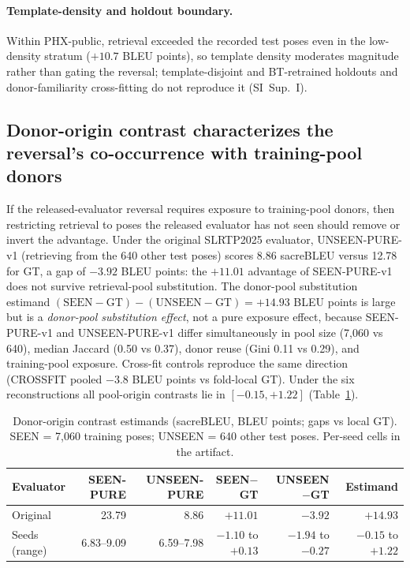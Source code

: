\documentclass[pdflatex,sn-chicago]{sn-jnl}
\begin{document}
\paragraph{Template-density and holdout boundary.}
Within PHX-public, retrieval exceeded the recorded test poses even in the low-density stratum ($+10.7$ BLEU points), so template density moderates magnitude rather than gating the reversal; template-disjoint and BT-retrained holdouts and donor-familiarity cross-fitting do not reproduce it (SI~Sup.~I).

\subsection{Donor-origin contrast characterizes the reversal's co-occurrence with training-pool donors}
\label{sec:exposure_results}

If the released-evaluator reversal requires exposure to training-pool donors, then restricting retrieval to poses the released evaluator has not seen should remove or invert the advantage. Under the original SLRTP2025 evaluator, UNSEEN-PURE-v1 (retrieving from the 640 other test poses) scores 8.86 sacreBLEU versus 12.78 for GT, a gap of $-3.92$ BLEU points: the $+11.01$ advantage of SEEN-PURE-v1 does not survive retrieval-pool substitution. The donor-pool substitution estimand $(\text{SEEN}-\text{GT})-(\text{UNSEEN}-\text{GT})=+14.93$ BLEU points is large but is a \emph{donor-pool substitution effect}, not a pure exposure effect, because SEEN-PURE-v1 and UNSEEN-PURE-v1 differ simultaneously in pool size (7{,}060 vs 640), median Jaccard (0.50 vs 0.37), donor reuse (Gini 0.11 vs 0.29), and training-pool exposure. Cross-fit controls reproduce the same direction (CROSSFIT pooled $-3.8$ BLEU points vs fold-local GT). Under the six reconstructions all pool-origin contrasts lie in $[-0.15,+1.22]$ (Table~\ref{tab:exposure_estimands}).

\begin{table}[t]
\centering
\scriptsize\setlength{\tabcolsep}{3pt}
\caption{Donor-origin contrast estimands (sacreBLEU, BLEU points; gaps vs local GT). SEEN = 7,060 training poses; UNSEEN = 640 other test poses. Per-seed cells in the artifact.}
\label{tab:exposure_estimands}
\begin{tabular}{lrrrrr}
\toprule
Evaluator & SEEN-PURE & UNSEEN-PURE & SEEN$-$GT & UNSEEN$-$GT & Estimand \\
\midrule
Original & 23.79 & 8.86 & $+11.01$ & $-3.92$ & $\mathbf{+14.93}$ \\
Seeds (range) & 6.83--9.09 & 6.59--7.98 & $-1.10$ to $+0.13$ & $-1.94$ to $-0.27$ & $-0.15$ to $+1.22$ \\
\bottomrule
\end{tabular}
\end{table}
\end{document}
